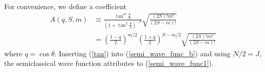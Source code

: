 \documentclass[%
superscriptaddress,
preprint,
showpacs,
nofootinbib,
amsmath,amssymb,
prc,
floatfix ]%
{revtex4-1}
\begin{document}
For convenience, we define a coefficient 
\begin{align}
  A(q,S,m) &\equiv 
  \frac{\tan^m{\frac{\theta}{2}}}{\left(1+\tan^2{\frac{\theta}{2}}\right)^{-S}}
  \sqrt{\frac{(2S)!m!}{(2S-m)!}}  \nonumber \\
  &= \left(\frac{1-q}{2}\right)^{m/2}\left(\frac{1+q}{2}\right)^{S-m/2} \sqrt{\frac{(2S)!m!}{(2S-m)!}}
\label{tan}
\end{align}
where $q=\cos{\theta}$. Inserting (\ref{tan}) into (\ref{semi_wave_func_b}) and using $N/2=J$, the semiclassical wave function attributes to (\ref{semi_wave_func1}).



\end{document}

